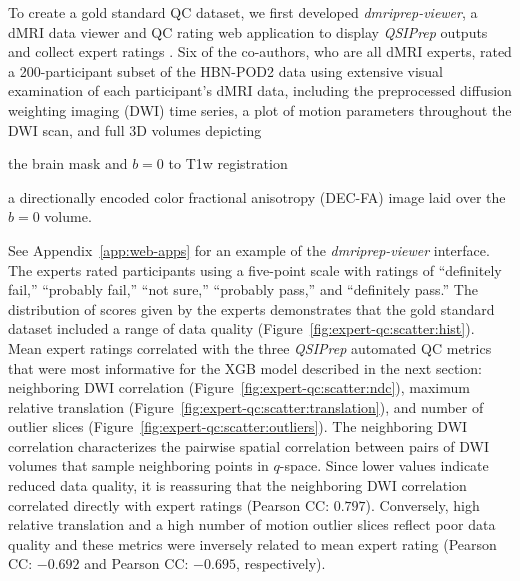 \documentclass[fleqn,10pt,inline]{wlscirep}
\begin{document}
To create a gold standard QC dataset, we first developed \emph{dmriprep-viewer},
a dMRI data viewer and QC rating web application to display \emph{QSIPrep}
outputs and collect expert ratings \cite{richie-halford2021-viewer}. Six of the
co-authors, who are all dMRI experts, rated a 200-participant subset of the
HBN-POD2 data using extensive visual examination of each participant's dMRI data,
including the preprocessed diffusion weighting imaging (DWI) time series, a plot of
motion parameters throughout the DWI scan, and full 3D volumes depicting
\begin{enumerate*}[%
    label=(\roman*),%
    before={{ }},%
    itemjoin={{, }},%
    itemjoin*={{ and }}]
    \item the brain mask and $b=0$ to T1w registration
    \item a directionally encoded color fractional anisotropy (DEC-FA) image laid over the $b=0$ volume.
\end{enumerate*}
See Appendix~\ref{app:web-apps} for an example of the \emph{dmriprep-viewer} interface. The experts rated participants using a five-point scale with ratings of ``definitely
fail,'' ``probably fail,'' ``not sure,'' ``probably pass,'' and ``definitely
pass.'' The distribution of scores given by the experts demonstrates that the
gold standard dataset included a range of data quality (Figure~\ref{fig:expert-qc:scatter:hist}). Mean expert ratings
correlated with the three \emph{QSIPrep} automated QC metrics that were most informative for the XGB model described in the next section:
neighboring DWI correlation \cite{yeh2019-kb} (Figure~\ref{fig:expert-qc:scatter:ndc}), maximum relative
translation (Figure~\ref{fig:expert-qc:scatter:translation}), and number of outlier slices (Figure~\ref{fig:expert-qc:scatter:outliers}). The neighboring DWI correlation characterizes
the pairwise spatial correlation between pairs of DWI volumes that sample
neighboring points in $q$-space. Since lower values indicate reduced data
quality, it is reassuring that the neighboring DWI correlation correlated directly with expert ratings
(Pearson CC: $0.797$). Conversely, high relative translation and a high number of
motion outlier slices reflect poor data quality and these metrics were inversely
related to mean expert rating (Pearson CC: $-0.692$ and Pearson CC: $-0.695$,
respectively).
\end{document}
